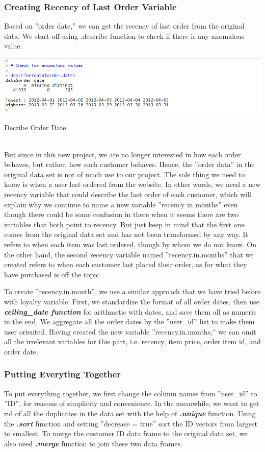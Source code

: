 \documentclass[a4paper,12pt,fleqn]{article}
\begin{document}
\subsubsection{Creating Recency of Last Order Variable}
Based on ''order date,'' we can get the recency of last order from the original data. We start off using .describe function to check if there is any anomalous value.\\
\begin{table}[h]
	\centering
	\includegraphics[width=0.95\linewidth]{"5.describe order date"}
	\caption{Decribe Order Date}
	\label{fig:5}
\end{table}\\
But since in this new project, we are no longer interested in how each order behaves, but rather, how each customer behaves. Hence, the ''order data'' in the original data set is not of much use to our project. The sole thing we need to know is when a user last ordered from the website. In other words, we need a new recency variable that could describe the last order of each customer, which will explain why we continue to name a new variable ''recency in months'' even though there could be some confusion in there when it seems there are two variables that both point to recency. But just keep in mind that the first one comes from the original data set and has not been transformed by any way. It refers to when each item was last ordered, though by whom we do not know. On the other hand, the second recency variable named ''recency.in.months'' that we created refers to when each customer last placed their order, as for what they have purchased is off the topic.

To create ''recency.in.month'', we use a similar approach that we have tried before with loyalty variable. First, we standardize the format of all order dates, then use \textbf{\textit{ceiling\_date function}} for arithmetic with dates, and save them all as numeric in the end. We aggregate all the order dates by the ''user\_id'' list to make them user oriented. Having created the new variable ''recency.in.months,'' we can omit all the irrelevant variables for this part, i.e. recency, item price, order item id, and order date.

\subsubsection{Putting Everyting Together}
To put everything together, we first change the column names from ''user\_id'' to ''ID'', for reasons of simplicity and convenience. In the meanwhile, we want to get rid of all the duplicates in the data set with the help of \textbf{\textit{.unique}} function. Using the \textbf{\textit{.sort}} function and setting ''decrease = true'' sort the ID vectors from largest to smallest. To merge the customer ID data frame to the original data set, we also need \textbf{\textit{.merge}} function to join these two data frames.
\end{document}
